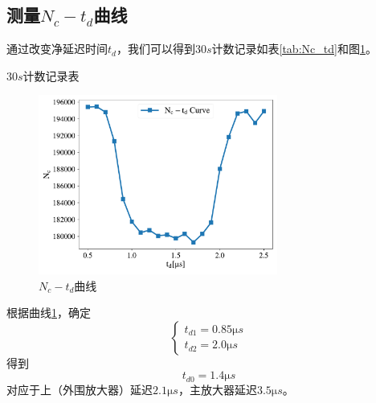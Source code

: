 \documentclass{article}
\begin{document}
\subsection{测量$N_c-t_d$曲线}
通过改变净延迟时间$t_d$，我们可以得到$30\si{s}$计数记录如表\ref{tab:Nc_td}和图\ref{fig:Nc_td}。
\begin{table}[htbp]
    \centering
    \caption{$30\si{s}$计数记录表\label{tab:Nc_td}}
    
\end{table}
\begin{figure}[htbp]
    \centering
    \includegraphics[width=0.7\textwidth]{../plots/Nc_td.pdf}
    \caption{$N_c-t_d$曲线\label{fig:Nc_td}}
\end{figure}
    
根据曲线\ref{fig:Nc_td}，确定
\begin{equation}
    \begin{cases}
    t_{d1} = 0.85\si{\micro s}\\
    t_{d2}=2.0\si{\micro s}
    \end{cases}
\end{equation}得到\begin{equation}
    t_{d0} = 1.4\si{\micro s}
\end{equation}对应于上（外围放大器）延迟$2.1\si{\micro s}$，主放大器延迟$3.5\si{\micro s}$。
\end{document}
